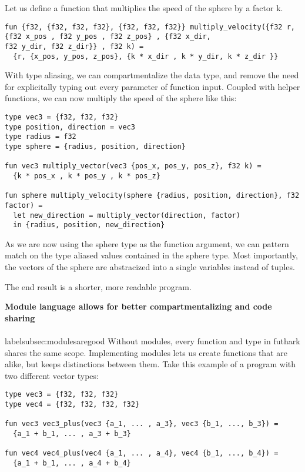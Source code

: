 Let us define a function that multiplies the speed of the sphere by a factor k.
\begin{verbatim}
fun {f32, {f32, f32, f32}, {f32, f32, f32}} multiply_velocity({f32 r, {f32 x_pos , f32 y_pos , f32 z_pos} , {f32 x_dir,
f32 y_dir, f32 z_dir}} , f32 k) =
  {r, {x_pos, y_pos, z_pos}, {k * x_dir , k * y_dir, k * z_dir }}
\end{verbatim}

With type aliasing, we can compartmentalize the data type, and remove the need
for explicitally typing out every parameter of function input.
Coupled with helper functions, we can now multiply the speed of the sphere like
this:

\begin{verbatim}
type vec3 = {f32, f32, f32}
type position, direction = vec3 
type radius = f32
type sphere = {radius, position, direction}

fun vec3 multiply_vector(vec3 {pos_x, pos_y, pos_z}, f32 k) =
  {k * pos_x , k * pos_y , k * pos_z}

fun sphere multiply_velocity(sphere {radius, position, direction}, f32 factor) =
  let new_direction = multiply_vector(direction, factor)
  in {radius, position, new_direction}
\end{verbatim}

As we are now using the sphere type as the function argument, we can pattern
match on the type aliased values contained in the sphere type.
Most importantly, the vectors of the sphere are abstracized into a single variables
instead of tuples.

The end result is a shorter, more readable program. %


\textbf{Module language allows for better compartmentalizing and code sharing} \\
\\label{subsec:modulesaregood}
Without modules, every function and type in futhark shares the same scope.
Implementing modules lets us create functions that are alike, but keeps
distinctions between them.
Take this example of a program with two different vector types:

\begin{verbatim}
type vec3 = {f32, f32, f32}
type vec4 = {f32, f32, f32, f32}

fun vec3 vec3_plus(vec3 {a_1, ... , a_3}, vec3 {b_1, ..., b_3}) =
  {a_1 + b_1, ... , a_3 + b_3}

fun vec4 vec4_plus(vec4 {a_1, ... , a_4}, vec4 {b_1, ..., b_4}) =
  {a_1 + b_1, ... , a_4 + b_4}
\end{verbatim}

